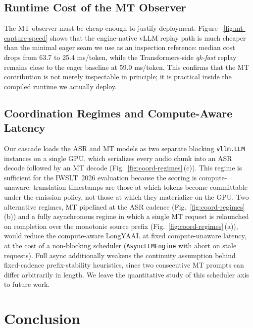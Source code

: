 \documentclass[11pt]{article}
\begin{document}


\subsection{Runtime Cost of the MT Observer}
\label{sec:runtime}

The MT observer must be cheap enough to justify deployment. Figure
~\ref{fig:mt-capture-speed} shows that the engine-native vLLM replay path is
much cheaper than the minimal eager seam we use as an inspection reference:
median cost drops from 63.7 to 25.4 ms/token, while the Transformers-side
\emph{qk-fast} replay remains close to the eager baseline at 59.0 ms/token.
This confirms that the MT contribution is not merely inspectable in principle;
it is practical inside the compiled runtime we actually deploy.



\subsection{Coordination Regimes and Compute-Aware Latency}

Our cascade loads the ASR and MT models as two separate blocking
\texttt{vllm.LLM} instances on a single GPU, which serializes every
audio chunk into an ASR decode followed by an MT decode
(Fig.~\ref{fig:coord-regimes}\,(c)). This regime is sufficient for the
IWSLT~2026 evaluation because the scoring is compute-unaware: translation
timestamps are those at which tokens become committable under the emission
policy, not those at which they materialize on the GPU. Two alternative
regimes, MT pipelined at the ASR cadence
(Fig.~\ref{fig:coord-regimes}\,(b)) and a fully asynchronous regime in
which a single MT request is relaunched on completion over the
monotonic source prefix (Fig.~\ref{fig:coord-regimes}\,(a)), would
reduce the compute-aware LongYAAL at fixed compute-unaware latency, at
the cost of a non-blocking scheduler (\texttt{AsyncLLMEngine} with
abort on stale requests). Full async additionally weakens the continuity
assumption behind fixed-cadence prefix-stability heuristics, since two
consecutive MT prompts can differ arbitrarily in length. We leave the
quantitative study of this scheduler axis to future work.



\section{Conclusion}
\label{sec:conclusion}
\end{document}
